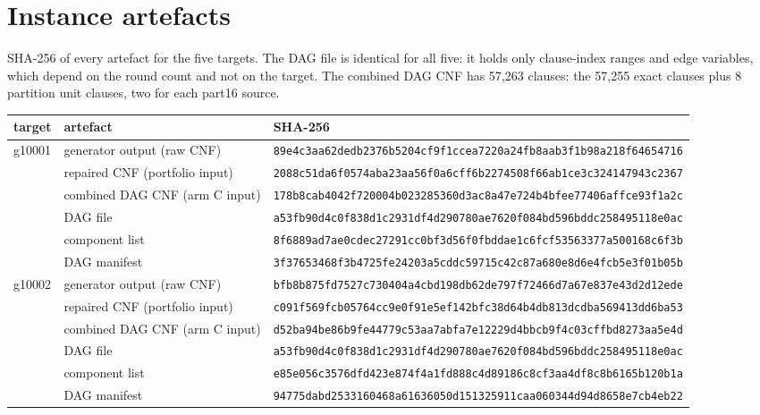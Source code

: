 \documentclass[11pt,a4paper]{article}
\begin{document}
\section{Instance artefacts}\label{app:instances}
SHA-256 of every artefact for the five targets. The DAG file is identical for all five: it holds only
clause-index ranges and edge variables, which depend on the round count and not on the target. The
combined DAG CNF has 57{,}263 clauses: the 57{,}255 exact clauses plus 8 partition unit clauses, two
for each part16 source.
{\scriptsize\setlength{\tabcolsep}{3pt}
\begin{longtable}{@{}lll@{}}
\toprule
\textbf{target} & \textbf{artefact} & \textbf{SHA-256}\\
\midrule\endhead
g10001 & generator output (raw CNF) & \texttt{89e4c3aa62dedb2376b5204cf9f1ccea7220a24fb8aab3f1b98a218f64654716}\\
 & repaired CNF (portfolio input) & \texttt{2088c51da6f0574aba23aa56f0a6cff6b2274508f66ab1ce3c324147943c2367}\\
 & combined DAG CNF (arm C input) & \texttt{178b8cab4042f720004b023285360d3ac8a47e724b4bfee77406affce93f1a2c}\\
 & DAG file & \texttt{a53fb90d4c0f838d1c2931df4d290780ae7620f084bd596bddc258495118e0ac}\\
 & component list & \texttt{8f6889ad7ae0cdec27291cc0bf3d56f0fbddae1c6fcf53563377a500168c6f3b}\\
 & DAG manifest & \texttt{3f37653468f3b4725fe24203a5cddc59715c42c87a680e8d6e4fcb5e3f01b05b}\\
\addlinespace
g10002 & generator output (raw CNF) & \texttt{bfb8b875fd7527c730404a4cbd198db62de797f72466d7a67e837e43d2d12ede}\\
 & repaired CNF (portfolio input) & \texttt{c091f569fcb05764cc9e0f91e5ef142bfc38d64b4db813dcdba569413dd6ba53}\\
 & combined DAG CNF (arm C input) & \texttt{d52ba94be86b9fe44779c53aa7abfa7e12229d4bbcb9f4c03cffbd8273aa5e4d}\\
 & DAG file & \texttt{a53fb90d4c0f838d1c2931df4d290780ae7620f084bd596bddc258495118e0ac}\\
 & component list & \texttt{e85e056c3576dfd423e874f4a1fd888c4d89186c8cf3aa4df8c8b6165b120b1a}\\
 & DAG manifest & \texttt{94775dabd2533160468a61636050d151325911caa060344d94d8658e7cb4eb22}\\

\end{longtable}}
\end{document}

